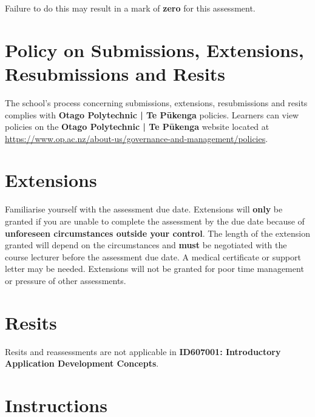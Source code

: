 \documentclass{article}
\begin{document}
 Failure to do this may result in a mark of \textbf{zero} for this assessment.

\section*{Policy on Submissions, Extensions, Resubmissions and Resits}
The school's process concerning submissions, extensions, resubmissions and resits complies with \textbf{Otago Polytechnic | Te Pūkenga} policies. Learners can view policies on the \textbf{Otago Polytechnic | Te Pūkenga} website located at \href{https://www.op.ac.nz/about-us/governance-and-management/policies}{https://www.op.ac.nz/about-us/governance-and-management/policies}. 

\section*{Extensions}
Familiarise yourself with the assessment due date. Extensions will \textbf{only} be granted if you are unable to complete the assessment by the due date because of \textbf{unforeseen circumstances outside your control}. The length of the extension granted will depend on the circumstances and \textbf{must} be negotiated with the course lecturer before the assessment due date. A medical certificate or support letter may be needed. Extensions will not be granted for poor time management or pressure of other assessments.

\section*{Resits}
Resits and reassessments are not applicable in \textbf{ID607001: Introductory Application Development Concepts}. 

\newpage

\section*{Instructions}
\end{document}
